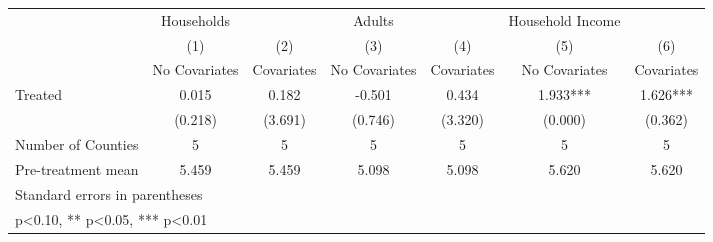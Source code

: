 {
\def\sym#1{\ifmmode^{#1}\else\(^{#1}\)\fi}
\begin{tabular}{l*{6}{c}}
\hline\hline
            &  Households   &               &      Adults   &               &Household Income   &               \\
            &\multicolumn{1}{c}{(1)}&\multicolumn{1}{c}{(2)}&\multicolumn{1}{c}{(3)}&\multicolumn{1}{c}{(4)}&\multicolumn{1}{c}{(5)}&\multicolumn{1}{c}{(6)}\\
            &\multicolumn{1}{c}{No Covariates}&\multicolumn{1}{c}{Covariates}&\multicolumn{1}{c}{No Covariates}&\multicolumn{1}{c}{Covariates}&\multicolumn{1}{c}{No Covariates}&\multicolumn{1}{c}{Covariates}\\
\hline
Treated     &       0.015   &       0.182   &      -0.501   &       0.434   &       1.933***&       1.626***\\
            &     (0.218)   &     (3.691)   &     (0.746)   &     (3.320)   &     (0.000)   &     (0.362)   \\
\hline
Number of Counties&           5   &           5   &           5   &           5   &           5   &           5   \\
Pre-treatment mean&       5.459   &       5.459   &       5.098   &       5.098   &       5.620   &       5.620   \\
\hline\hline
\multicolumn{7}{l}{\footnotesize Standard errors in parentheses}\\
\multicolumn{7}{l}{\footnotesize * p<0.10, ** p<0.05, *** p<0.01}\\
\end{tabular}
}
